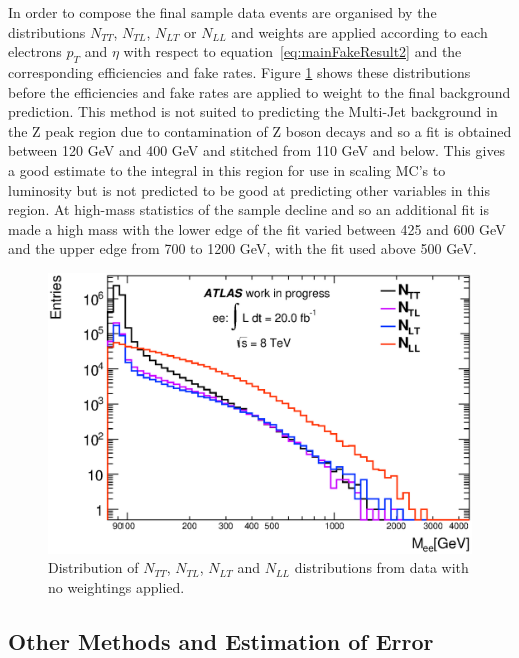 In order to compose the final sample data events are organised by the distributions $N_{TT}$, $N_{TL}$, $N_{LT}$ or $N_{LL}$ and weights are applied according to each electrons $p_{T}$ and $\eta$ with respect to equation~\ref{eq:mainFakeResult2} and the corresponding efficiencies and fake rates. 
Figure \ref{fig:N_dist} shows these distributions before the efficiencies and fake rates are applied to weight to the final background prediction. This method is not suited to predicting the Multi-Jet background in the Z peak region due to contamination of Z boson decays and so a fit is obtained between 120 GeV and 400 GeV and stitched from 110 GeV and below. This gives a good estimate to the integral in this region for use in scaling MC's to luminosity but is not predicted to be good at predicting other variables in this region. At high-mass statistics of the sample decline and so an additional fit is made a high mass with the lower edge of the fit varied between 425 and 600 GeV and the upper edge from 700 to 1200 GeV, with the fit used above 500 GeV.

   \begin{figure}[h]
      \begin{center}
      \includegraphics[width=0.98\linewidth]{images/N_distributions.eps}
      \end{center}
   \caption{Distribution of $N_{TT}$, $N_{TL}$, $N_{LT}$ and $N_{LL}$ distributions from data with no weightings applied.}
   \label{fig:N_dist}
   \end{figure}






\subsection{Other Methods and Estimation of Error}
   \label{sec:MJerror}


